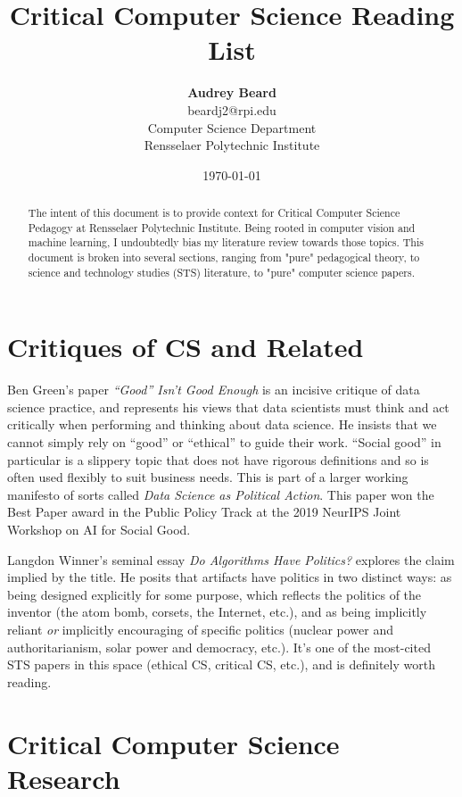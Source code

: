 \documentclass{article}
\title{Critical Computer Science Reading List}
\author{\textbf{Audrey Beard} \\
        beardj2@rpi.edu \\
        Computer Science Department \\
        Rensselaer Polytechnic Institute}
\date{\today}
\begin{document}
\maketitle

\begin{abstract}
    The intent of this document is to provide context for Critical Computer Science Pedagogy at Rensselaer Polytechnic Institute.
    Being rooted in computer vision and machine learning, I undoubtedly bias my literature review towards those topics.
    This document is broken into several sections, ranging from "pure" pedagogical theory, to science and technology studies (STS) literature, to "pure" computer science papers.
\end{abstract}
    
\section{Critiques of CS and Related}
    Ben Green's paper \textit{``Good'' Isn't Good Enough}\cite{greenGoodIsnGood2019} is an incisive critique of data science practice, and represents his views that data scientists must think and act critically when performing and thinking about data science.
    He insists that we cannot simply rely on ``good'' or ``ethical'' to guide their work. ``Social good'' in particular is a slippery topic that does not have rigorous definitions and so is often used flexibly to suit business needs.
    This is part of a larger working manifesto of sorts called \textit{Data Science as Political Action}\cite{greenDataSciencePolitical2019}.
    This paper won the Best Paper award in the Public Policy Track at the 2019 NeurIPS Joint Workshop on AI for Social Good.
    
    Langdon Winner's seminal essay \textit{Do Algorithms Have Politics?}\cite{winnerArtifactsHavePolitics1980} explores the claim implied by the title. He posits that artifacts have politics in two distinct ways: as being designed explicitly for some purpose, which reflects the politics of the inventor (the atom bomb, corsets, the Internet, etc.), and as being implicitly reliant \textit{or} implicitly encouraging of specific politics (nuclear power and authoritarianism, solar power and democracy, etc.). It's one of the most-cited STS papers in this space (ethical CS, critical CS, etc.), and is definitely worth reading.

\section{Critical Computer Science Research}
    
\end{document}
